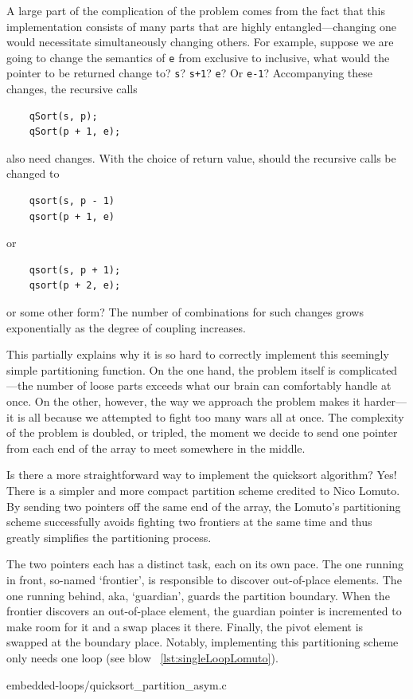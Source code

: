 \documentclass[oneside,11pt]{book}
\theoremstyle{definition}
\theoremstyle{remark}
\newcommand{\code}[1]{\mbox{\lstinline{#1}}}
\begin{document}
A large part of the complication of the problem comes from the fact that this implementation
consists of many parts that are highly entangled---changing one would necessitate simultaneously
changing others.
For example,
suppose we are going to change the semantics of \code{e} from exclusive to inclusive, what
would the pointer to be returned change to?
\code{s}? \code{s+1}? \code{e}? Or \code{e-1}?
Accompanying these changes, the recursive calls
\begin{lstlisting}
    qSort(s, p);
    qSort(p + 1, e);
\end{lstlisting}
also need changes.
With the choice of return value, should the recursive calls be changed to
\begin{lstlisting}
    qsort(s, p - 1)
    qsort(p + 1, e)
\end{lstlisting}
or
\begin{lstlisting}
    qsort(s, p + 1);
    qsort(p + 2, e);
\end{lstlisting}
or some other form?
The number of combinations for such changes grows exponentially as the degree of coupling increases.


This partially explains why it is so hard to correctly implement this seemingly simple partitioning
function.
On the one hand, the problem itself is complicated---the number of loose parts exceeds what our
brain can comfortably handle at once.
On the other, however, the way we approach the problem makes it harder---it is all because
we attempted to fight too many wars all at once.
The complexity of the problem is doubled, or tripled, the moment we decide to send one pointer
from each end of the array to meet somewhere in the middle.


Is there a more straightforward way to implement the quicksort algorithm?
Yes!
There is a simpler and more compact partition scheme credited to Nico Lomuto\cite{Bentley:1986:PP}.
By sending two pointers off the same end of the array, the Lomuto's partitioning scheme
successfully avoids fighting two frontiers at the same time and thus greatly simplifies the
partitioning process.


The two pointers each has a distinct task, each on its own pace.
The one running in front, so-named `frontier', is responsible to discover out-of-place elements.
The one running behind, aka, `guardian', guards the partition boundary.
When the frontier discovers an out-of-place element, the guardian pointer is incremented to make
room for it and a swap places it there.
Finally, the pivot element is swapped at the boundary place.
Notably, implementing this partitioning scheme only needs one loop
(see blow ~\autoref{lst:singleLoopLomuto}).

{embedded-loops/quicksort_partition_asym.c}
\end{document}
